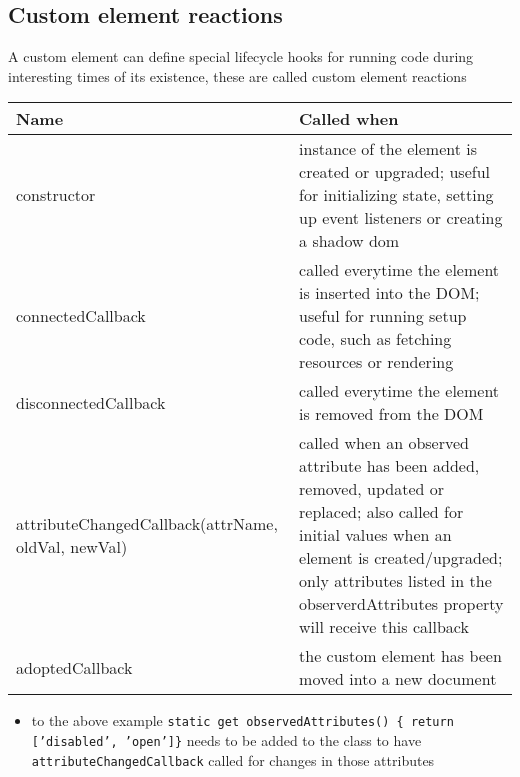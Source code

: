 \documentclass[11pt]{article}
\begin{document}
\subsection{Custom element reactions}
\label{sec:org5e9723b}
A custom element can define special lifecycle hooks for running code during interesting times of its existence, these are called custom element reactions
\begin{center}
\begin{tabular}{p{6cm}p{10cm}}
Name & Called when\\
\hline
constructor & instance of the element is created or upgraded; useful for initializing state, setting up event listeners or creating a shadow dom\\
connectedCallback & called everytime the element is inserted into the DOM; useful for running setup code, such as fetching resources or rendering\\
disconnectedCallback & called everytime the element is removed from the DOM\\
attributeChangedCallback(attrName, oldVal, newVal) & called when an observed attribute has been added, removed, updated or replaced; also called for initial values when an element is created/upgraded; only attributes listed in the observerdAttributes property will receive this callback\\
adoptedCallback & the custom element has been moved into a new document\\
\end{tabular}
\end{center}
\begin{itemize}
\item to the above example \texttt{static get observedAttributes() \{ return ['disabled', 'open']\}} needs to be added to the class to have \texttt{attributeChangedCallback} called for changes in those attributes
\end{itemize}
\end{document}
